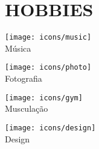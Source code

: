 {\color{primary}\section*{\MakeUppercase{Hobbies}}}

\begin{minipage}[t]{.15\textwidth}
	\centering
	\vbox{\texttt{[image: icons/music]}\\[4pt]Música}
\end{minipage}
\begin{minipage}[t]{.15\textwidth}
	\centering
	\vbox{\texttt{[image: icons/photo]}\\[4pt]Fotografia}
\end{minipage}
\begin{minipage}[t]{.15\textwidth}
	\centering
	\vbox{\texttt{[image: icons/gym]}\\[4pt]Musculação}
\end{minipage}
\begin{minipage}[t]{.15\textwidth}
	\centering
	\vbox{\texttt{[image: icons/design]}\\[4pt]Design}
\end{minipage}

